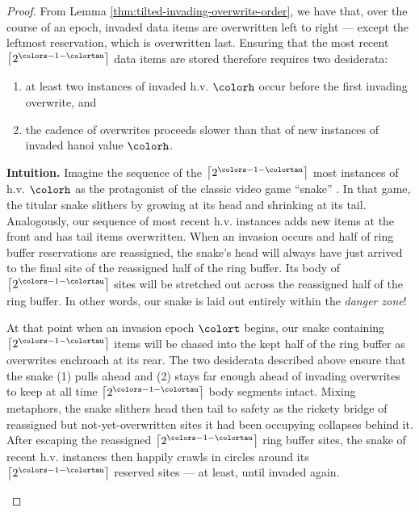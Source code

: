 \begin{proof}
From Lemma \ref{thm:tilted-invading-overwrite-order}, we have that, over the course of an epoch, invaded data items are overwritten left to right --- except the leftmost reservation, which is overwritten last.
Ensuring that the most recent $\left\lceil 2^{\colors - 1 - \colortau} \right\rceil$ data items are stored therefore requires two desiderata:
\begin{enumerate}
\item at least two instances of invaded h.v. $\colorh$ occur before the first invading overwrite, and
\item the cadence of overwrites proceeds slower than that of new instances of invaded hanoi value $\colorh$.
\end{enumerate}


\begin{mybox}
\textbf{Intuition.}
Imagine the sequence of the $\left\lceil 2^{\colors - 1 - \colortau} \right\rceil$ most instances of h.v. $\colorh$ as the protagonist of the classic video game ``snake'' \citep{de2016complexity}.
In that game, the titular snake slithers by growing at its head and shrinking at its tail.
Analogously, our sequence of most recent h.v. instances adds new items at the front and has tail items overwritten.
When an invasion occurs and half of ring buffer reservations are reassigned, the snake's head will always have just arrived to the final site of the reassigned half of the ring buffer.
Its body of $\left\lceil 2^{\colors - 1 - \colortau} \right\rceil$ sites will be stretched out across the reassigned half of the ring buffer.
In other words, our snake is laid out entirely within the \textit{danger zone}!

At that point when an invasion epoch $\colort$ begins, our snake containing $\left\lceil 2^{\colors - 1 - \colortau} \right\rceil$ items will be chased into the kept half of the ring buffer as overwrites enchroach at its rear.
The two desiderata described above ensure that the snake (1) pulls ahead and (2) stays far enough ahead of invading overwrites to keep at all time $\left\lceil 2^{\colors - 1 - \colortau} \right\rceil$ body segments intact.
Mixing metaphors, the snake slithers head then tail to safety as the rickety bridge of reassigned but not-yet-overwritten sites it had been occupying collapses behind it.
After escaping the reassigned $\left\lceil 2^{\colors - 1 - \colortau} \right\rceil$ ring buffer sites, the snake of recent h.v. instances then happily crawls in circles around its $\left\lceil 2^{\colors - 1 - \colortau} \right\rceil$ reserved sites --- at least, until invaded again.
\end{mybox}


\end{proof}
